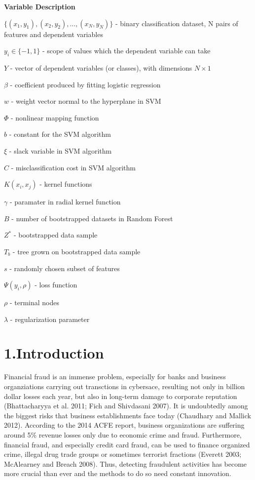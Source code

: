 \documentclass[12pt,]{article}
\begin{document}
\centering

\raggedright
\clearpage

\tableofcontents
\clearpage

\listoffigures
\clearpage

\listoftables
\clearpage

\textbf{Variable Description}

\({\{(x_1,y_1),(x_2,y_2),...,(x_N,y_N)\}}\) - binary classification
dataset, N pairs of features and dependent variables

\(y_i \in \{-1,1\}\) - scope of values which the dependent variable can
take

\(Y\) - vector of dependent variables (or classes), with dimensions
\(N\times1\)

\(\beta\) - coefficient produced by fitting logistic regression

\(w\) - weight vector normal to the hyperplane in SVM

\(\Phi\) - nonlinear mapping function

\(b\) - constant for the SVM algorithm

\(\xi\) - slack variable in SVM algorithm

\(C\) - misclassification cost in SVM algorithm

\(K(x_i,x_j)\) - kernel functions

\(\gamma\) - paramater in radial kernel function

\(B\) - number of bootstrapped datasets in Random Forest

\(Z^*\) - bootstrapped data sample

\(T_b\) - tree grown on bootstrapped data sample

\(s\) - randomly chosen subset of features

\(\Psi(y_i,\rho)\) - loss function

\(\rho\) - terminal nodes

\(\lambda\) - regularization parameter

\clearpage

\justify

\hypertarget{introduction}{%
\section{1.Introduction}\label{introduction}}

Financial fraud is an immense problem, especially for banks and business
organziations carrying out transctions in cybersace, resulting not only
in billion dollar losses each year, but also in long-term damage to
corporate reputation (Bhattacharyya et al. 2011; Fich and Shivdasani
2007). It is undoubtedly among the biggest risks that business
establishments face today (Chaudhary and Mallick 2012). According to the
2014 ACFE report, business organizations are suffering around 5\%
revenue losses only due to economic crime and fraud. Furthermore,
financial fraud, and especially credit card fraud, can be used to
finance organized crime, illegal drug trade groups or sometimes
terrorist fractions (Everett 2003; McAlearney and Breach 2008). Thus,
detecting fraudulent activities has become more crucial than ever and
the methods to do so need constant innovation.
\end{document}
